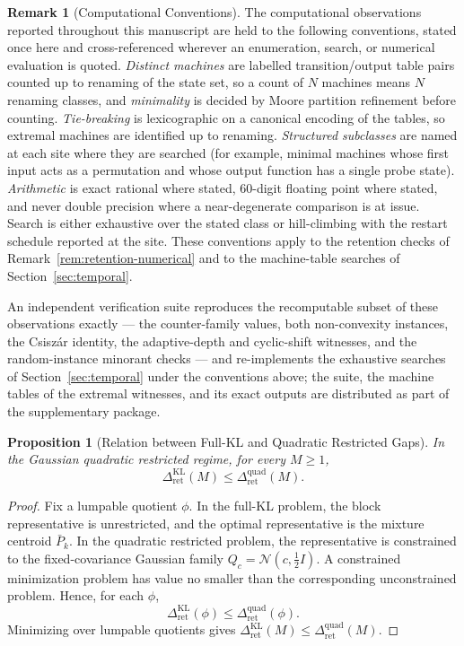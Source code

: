 \documentclass[12pt]{article}
\newtheorem{proposition}[theorem]{Proposition}
\theoremstyle{definition}
\newtheorem{remark}[theorem]{Remark}
\newcommand{\RetKL}{\Delta_{\mathrm{ret}}^{\mathrm{KL}}}
\newcommand{\RetQuad}{\Delta_{\mathrm{ret}}^{\mathrm{quad}}}
\begin{document}
\begin{remark}[Computational Conventions]
\label{rem:computational-conventions}
The computational observations reported throughout this manuscript are held to
the following conventions, stated once here and cross-referenced wherever an
enumeration, search, or numerical evaluation is quoted.  \emph{Distinct
machines} are labelled transition/output table pairs counted up to renaming of
the state set, so a count of $N$ machines means $N$ renaming classes, and
\emph{minimality} is decided by Moore partition refinement before counting.
\emph{Tie-breaking} is lexicographic on a canonical encoding of the tables, so
extremal machines are identified up to renaming.  \emph{Structured subclasses}
are named at each site where they are searched (for example, minimal machines
whose first input acts as a permutation and whose output function has a single
probe state).  \emph{Arithmetic} is exact rational where stated,
$60$-digit floating point where stated, and never double precision where a
near-degenerate comparison is at issue.  Search is either exhaustive over the
stated class or hill-climbing with the restart schedule reported at the site.
These conventions apply to the retention checks of
Remark~\ref{rem:retention-numerical} and to the machine-table searches of
Section~\ref{sec:temporal}.

An independent verification suite reproduces the recomputable subset of these
observations exactly --- the counter-family values, both non-convexity
instances, the Csisz\'ar identity, the adaptive-depth and cyclic-shift
witnesses, and the random-instance minorant checks --- and re-implements the
exhaustive searches of Section~\ref{sec:temporal} under the conventions
above; the suite, the machine tables of the extremal witnesses, and its
exact outputs are distributed as part of the supplementary package.
\end{remark}

\begin{proposition}[Relation between Full-KL and Quadratic Restricted Gaps]
\label{prop:retkl-le-retquad}
In the Gaussian quadratic restricted regime, for every $M\ge1$,
\[
\RetKL(M)\le \RetQuad(M).
\]
\end{proposition}

\begin{proof}
Fix a lumpable quotient $\phi$.  In the full-KL problem, the block
representative is unrestricted, and the optimal representative is the mixture
centroid $\bar P_k$.  In the quadratic restricted problem, the representative
is constrained to the fixed-covariance Gaussian family
$Q_c=\mathcal N(c,\tfrac12 I)$.  A constrained minimization problem has value
no smaller than the corresponding unconstrained problem.  Hence, for each
$\phi$,
\[
\RetKL(\phi)\le \RetQuad(\phi).
\]
Minimizing over lumpable quotients gives $\RetKL(M)\le \RetQuad(M)$.
\end{proof}
\end{document}
